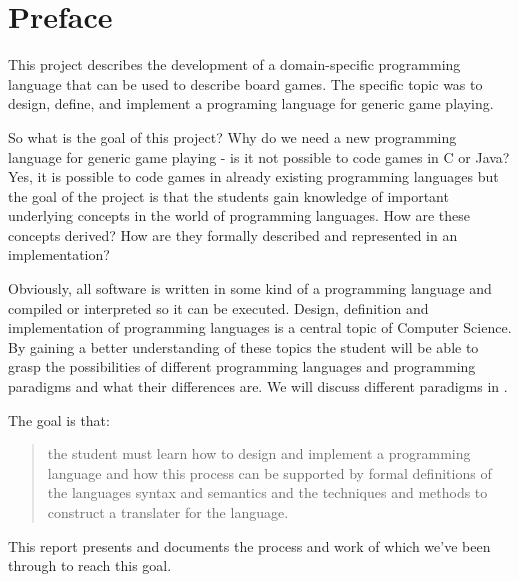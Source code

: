 \chapter*{Preface}
\label{chap:preface}
This project describes the development of a domain-specific programming language that can be used to describe board games. The specific topic was to design, define, and implement a programing language for generic game playing. 


So what is the goal of this project? Why do we need a new programming language for generic game playing - is it not possible to code games in C or Java? Yes, it is possible to code games in already existing programming languages but the goal of the project is that the students gain knowledge of important underlying concepts in the world of programming languages. How are these concepts derived? How are they formally described and represented in an implementation? 

Obviously, all software is written in some kind of a programming language and compiled or interpreted so it can be executed. Design, definition and implementation of programming languages is a central topic of Computer Science. By gaining a better understanding of these topics the student will be able to grasp the possibilities of different programming languages and programming paradigms and what their differences are.\cite[p. 22]{dat-stud-ordning} We will discuss different paradigms in . 

The goal is that:
\begin{quote}
the student must learn how to design and implement a programming language and how this process can be supported by formal definitions of the languages syntax and semantics and the techniques and methods to construct a translater for the language.\cite[p. 22]{dat-stud-ordning}
\end{quote}

This report presents and documents the process and work of which we've been through to reach this goal.